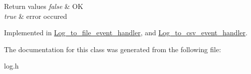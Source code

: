 \begin{DoxyRetVals}{Return values}
{\em false} & OK \\
\hline
{\em true} & error occured \\
\hline
\end{DoxyRetVals}


Implemented in \mbox{\hyperlink{classLog__to__file__event__handler_ab0454bdadd9f2a600a928c3fa5fd4551}{Log\+\_\+to\+\_\+file\+\_\+event\+\_\+handler}}, and \mbox{\hyperlink{classLog__to__csv__event__handler_a70587b1ff21463136fe16302d13b3740}{Log\+\_\+to\+\_\+csv\+\_\+event\+\_\+handler}}.



The documentation for this class was generated from the following file\+:\begin{DoxyCompactItemize}
\item 
log.\+h\end{DoxyCompactItemize}
